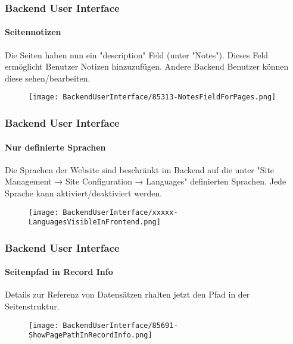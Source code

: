 
\begin{frame}[fragile]
	\frametitle{Backend User Interface}
	\framesubtitle{Seitennotizen}

	Die Seiten haben nun ein "description" Feld (unter "Notes"). Dieses Feld ermöglicht Benutzer Notizen 
	hinzuzufügen. Andere Backend Benutzer können diese sehen/bearbeiten.

	\begin{figure}
		\texttt{[image: BackendUserInterface/85313-NotesFieldForPages.png]}
	\end{figure}

\end{frame}


\begin{frame}[fragile]
	\frametitle{Backend User Interface}
	\framesubtitle{Nur definierte Sprachen}

	Die Sprachen der Website sind beschränkt im Backend auf die unter
	"Site Management → Site Configuration → Languages" definierten Sprachen. Jede Sprache kann 
	aktiviert/deaktiviert werden.

	\begin{figure}
		\texttt{[image: BackendUserInterface/xxxxx-LanguagesVisibleInFrontend.png]}
	\end{figure}

\end{frame}


\begin{frame}[fragile]
	\frametitle{Backend User Interface}
	\framesubtitle{Seitenpfad in Record Info}

	Details zur Referenz von Datensätzen rhalten jetzt den Pfad in der Seitenstruktur.

	\begin{figure}
		\texttt{[image: BackendUserInterface/85691-ShowPagePathInRecordInfo.png]}
	\end{figure}

\end{frame}

